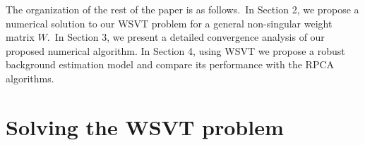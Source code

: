 \documentclass[twoside,11pt]{article}
\begin{document}
The organization of the rest of the paper is as follows.~In Section 2, we propose a numerical solution to our WSVT problem for a general non-singular weight matrix $W$.~In Section 3, we present a detailed convergence analysis of our proposed numerical algorithm. In Section 4, using WSVT we propose a robust background estimation model and compare its performance with the RPCA algorithms. 






\section{Solving the WSVT problem}
\end{document}
